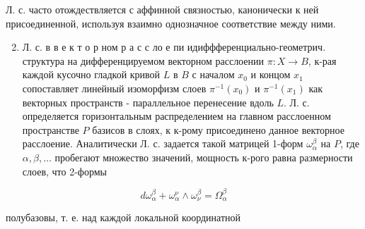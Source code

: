 \documentclass[10pt]{article}
\begin{document}
Л. с. часто отождествляется с аффинной связностью, канонически к ней присоединенной, используя взаимно однозначное соответствие между ними.



\begin{enumerate}

  \setcounter{enumi}{1}

  \item Л. с. в в е к т о р ном р а с с ло е пи идиффференциально-геометрич. структура на дифференцируемом векторном расслоении $\pi: X \rightarrow B$, к-рая каждой кусочно гладкой кривой $L$ в $B$ с началом $x_{0}$ и концом $x_{1}$ сопоставляет линейный изоморфизм слоев $\pi^{-1}\left(x_{0}\right)$ и $\pi^{-1}\left(x_{1}\right)$ как векторных пространств - параллельное перенесение вдоль $L$. Л. с. определяется горизонтальным распределением на главном расслоенном пространстве $P$ базисов в слоях, к к-рому присоединено данное векторное расслоение. Аналитически Л. с. задается такой матрицей 1-форм $\omega_{\alpha}^{\beta}$ на $P$, где $\alpha, \beta, \ldots$ пробегают множество значений, мощность к-рого равна размерности слоев, что 2-формы

\end{enumerate}



\[

d \omega_{\alpha}^{\beta}+\omega_{\alpha}^{\mathcal{\nu}} \wedge \omega_{\mathcal{\nu}}^{\beta}=\Omega_{\alpha}^{\beta}

\]



полубазовы, т. е. над каждой локальной координатной
\end{document}
